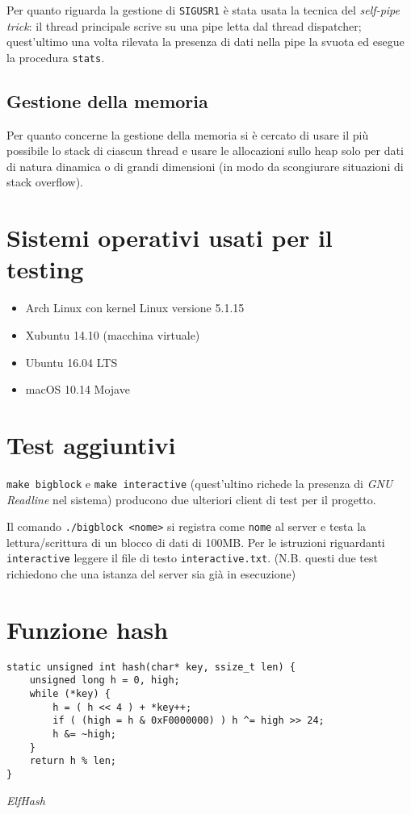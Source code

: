 \documentclass[a4paper,11pt]{article}
\begin{document}
Per quanto riguarda la gestione di \texttt{SIGUSR1} è stata usata la tecnica del \emph{self-pipe trick}: il thread principale scrive su una pipe letta dal thread dispatcher; quest'ultimo
una volta rilevata la presenza di dati nella pipe la svuota ed esegue la procedura \texttt{stats}.

\subsection{Gestione della memoria}
Per quanto concerne la gestione della memoria si è cercato di usare il più possibile lo stack di ciascun thread e usare le allocazioni sullo heap solo per dati
di natura dinamica o di grandi dimensioni (in modo da scongiurare situazioni di stack overflow).
\newpage
\begin{appendices}
\section{Sistemi operativi usati per il testing}
\begin{itemize}
    \item Arch Linux con kernel Linux versione 5.1.15
    \item Xubuntu 14.10 (macchina virtuale)
    \item Ubuntu 16.04 LTS
    \item macOS 10.14 Mojave
\end{itemize}

\section{Test aggiuntivi}
\texttt{make bigblock} e \texttt{make interactive} (quest'ultino richede la presenza di \emph{GNU Readline} nel sistema)
producono due ulteriori client di test per il progetto.

Il comando \texttt{./bigblock <nome>} si registra come \texttt{nome} al server e testa la lettura/scrittura di un blocco di dati di 100MB.
Per le istruzioni riguardanti \texttt{interactive} leggere il file di testo \texttt{interactive.txt}. 
(N.B. questi due test richiedono che una istanza del server sia già in esecuzione)
\section{Funzione hash}
\begin{listing}[ht]
    \begin{verbatim}
static unsigned int hash(char* key, ssize_t len) {
    unsigned long h = 0, high;
    while (*key) {
        h = ( h << 4 ) + *key++;
        if ( (high = h & 0xF0000000) ) h ^= high >> 24;
        h &= ~high;
    }
    return h % len;
}
    \end{verbatim}
    \caption{\emph{ElfHash}}
\end{listing}
\end{appendices}    
\end{document}
